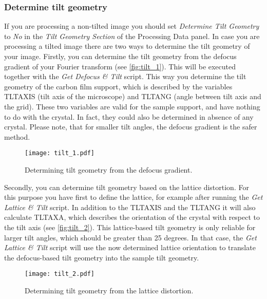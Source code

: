 \subsubsection{Determine tilt geometry}
\label{sec:det_tilt}



If you are processing a non-tilted image you should set \textit{Determine Tilt Geometry} to \textit{No} in the \textit{Tilt Geometry Section} of the Processing Data panel.
In case you are processing a tilted image there are two ways to determine the tilt geometry of your image. Firstly, you can determine the tilt geometry from the defocus gradient  of your Fourier transform (see \autoref{fig:tilt_1}). This will be executed together with the \textit{Get Defocus \& Tilt} script. This way you determine the tilt geometry of the carbon film support, which is described by the variables TLTAXIS (tilt axis of the microscope) and TLTANG (angle between tilt axis and the grid). These two variables are valid for the sample support, and have nothing to do with the crystal. In fact, they could also be determined in absence of any crystal. Please note, that for smaller tilt angles, the defocus gradient is the safer method.

\begin{figure}[H]
		\centering
		\texttt{[image: tilt\_1.pdf]}
		\caption{Determining tilt geometry from the defocus gradient.}
		\label{fig:tilt_1}
	\end{figure}
	

Secondly, you can determine tilt geometry based on the lattice distortion. For this purpose you have first to define the lattice, for example after running the \textit{Get Lattice \& Tilt} script. 
In addition to the TLTAXIS and the TLTANG it will also calculate TLTAXA, which describes the orientation of the crystal with respect to the tilt axis (see \autoref{fig:tilt_2}).
This lattice-based tilt geometry is only reliable for larger tilt angles, which should be greater than 25 degrees. In that case, the \textit{Get Lattice \& Tilt} script will use the now determined lattice orientation to translate the defocus-based tilt geometry into the sample tilt geometry.

\begin{figure}[H]
		\centering
		\texttt{[image: tilt\_2.pdf]}
		\caption{Determining tilt geometry from the lattice distortion.}
		\label{fig:tilt_2}
	\end{figure}
	




